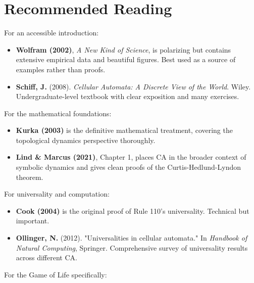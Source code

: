 \section{Recommended Reading}

For an accessible introduction:

\begin{itemize}
\item \textbf{Wolfram (2002)}, \textit{A New Kind of Science}, is polarizing but contains extensive empirical data and beautiful figures. Best used as a source of examples rather than proofs.
\end{itemize}

\begin{itemize}
\item \textbf{Schiff, J.} (2008). \textit{Cellular Automata: A Discrete View of the World}. Wiley. Undergraduate-level textbook with clear exposition and many exercises.
\end{itemize}

For the mathematical foundations:

\begin{itemize}
\item \textbf{Kurka (2003)} is the definitive mathematical treatment, covering the topological dynamics perspective thoroughly.
\end{itemize}

\begin{itemize}
\item \textbf{Lind \& Marcus (2021)}, Chapter 1, places CA in the broader context of symbolic dynamics and gives clean proofs of the Curtis-Hedlund-Lyndon theorem.
\end{itemize}

For universality and computation:

\begin{itemize}
\item \textbf{Cook (2004)} is the original proof of Rule 110's universality. Technical but important.
\end{itemize}

\begin{itemize}
\item \textbf{Ollinger, N.} (2012). "Universalities in cellular automata." In \textit{Handbook of Natural Computing}, Springer. Comprehensive survey of universality results across different CA.
\end{itemize}

For the Game of Life specifically:

